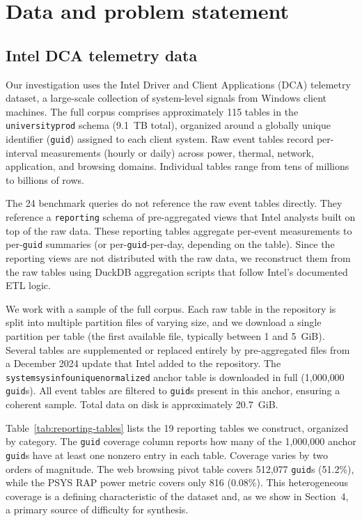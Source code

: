 \documentclass[12pt,letterpaper]{article}
\renewcommand{\_}{\textunderscore\allowbreak}
\begin{document}
\newpage

\section{Data and problem statement}

\subsection{Intel DCA telemetry data}

Our investigation uses the Intel Driver and Client Applications (DCA) telemetry dataset, a large-scale collection of system-level signals from Windows client machines. The full corpus comprises approximately 115 tables in the \texttt{university\_prod} schema (9.1~TB total), organized around a globally unique identifier (\texttt{guid}) assigned to each client system. Raw event tables record per-interval measurements (hourly or daily) across power, thermal, network, application, and browsing domains. Individual tables range from tens of millions to billions of rows.

The 24 benchmark queries do not reference the raw event tables directly. They reference a \texttt{reporting} schema of pre-aggregated views that Intel analysts built on top of the raw data. These reporting tables aggregate per-event measurements to per-\texttt{guid} summaries (or per-\texttt{guid}-per-day, depending on the table). Since the reporting views are not distributed with the raw data, we reconstruct them from the raw tables using DuckDB aggregation scripts that follow Intel's documented ETL logic.

We work with a sample of the full corpus. Each raw table in the repository is split into multiple partition files of varying size, and we download a single partition per table (the first available file, typically between 1 and 5~GiB). Several tables are supplemented or replaced entirely by pre-aggregated files from a December 2024 update that Intel added to the repository. The \texttt{system\_sysinfo\_unique\_normalized} anchor table is downloaded in full (1{,}000{,}000 \texttt{guid}s). All event tables are filtered to \texttt{guid}s present in this anchor, ensuring a coherent sample. Total data on disk is approximately 20.7~GiB.

Table~\ref{tab:reporting-tables} lists the 19 reporting tables we construct, organized by category. The \texttt{guid} coverage column reports how many of the 1{,}000{,}000 anchor \texttt{guid}s have at least one nonzero entry in each table. Coverage varies by two orders of magnitude. The web browsing pivot table covers 512{,}077 \texttt{guid}s (51.2\%), while the PSYS RAP power metric covers only 816 (0.08\%). This heterogeneous coverage is a defining characteristic of the dataset and, as we show in Section~4, a primary source of difficulty for synthesis.
\end{document}
